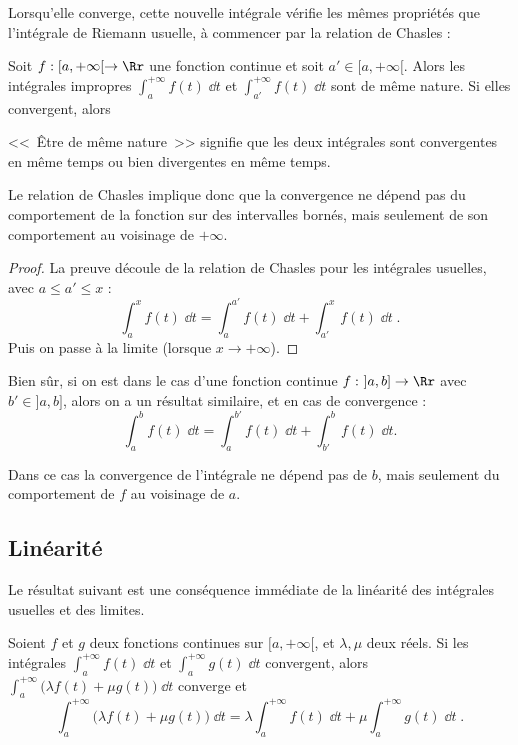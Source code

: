 \documentclass[class=report,crop=false]{standalone}
\begin{document}
Lorsqu'elle converge, cette nouvelle intégrale vérifie les mêmes 
propriétés que l'intégrale de Riemann usuelle, à commencer par la relation de Chasles :

\begin{proposition}
Soit $f : [a,+\infty[ \to \Rr$ une fonction continue et soit
  $a' \in [a,+\infty[$. 
  Alors les intégrales impropres $\int_a^{+\infty} f(t) \;\dd t$ 
  et $\int_{a'}^{+\infty} f(t) \;\dd t $ sont de même nature. 
  Si elles convergent, alors 
\end{proposition}

<<~\^Etre de même nature~>> signifie que les deux intégrales sont convergentes en même temps
ou bien divergentes en même temps.

Le relation de Chasles implique donc que la convergence ne dépend
pas du comportement de la fonction sur des intervalles bornés,
mais seulement de son comportement au voisinage de $+\infty$.

\begin{proof}
La preuve découle de la relation de Chasles pour les intégrales usuelles, avec $a \le a' \le x$ : 
$$\int_a^x f(t) \;\dd t = \int_a^{a'}f(t) \;\dd t+\int_{a'}^x f(t) \;\dd t\;.$$
Puis on passe à la limite (lorsque $x\to+\infty$).
\end{proof}

\bigskip

Bien sûr, si on est dans le cas d'une fonction continue $f : \ ]a,b] \to \Rr$ avec
$b' \in ]a,b]$, alors on a un résultat similaire, et en cas de convergence :
  $$\int_a^{b} f(t) \;\dd t = \int_{a}^{b'} f(t) \;\dd t+ \int_{b'}^{b} f(t) \;\dd t.$$

Dans ce cas la convergence de l'intégrale ne dépend pas de $b$, mais seulement 
du comportement de $f$ au voisinage de $a$.


\subsection{Linéarité}

Le résultat suivant est une conséquence immédiate de la
linéarité des intégrales usuelles et des limites.

\begin{proposition}
\label{prop:lineariteintegralescv}
Soient $f$ et $g$ deux fonctions continues sur
$[a,+\infty[$, et $\lambda,\mu$ deux réels. Si
les intégrales $\int_a^{+\infty} f(t)\;\dd t$ et 
$\int_a^{+\infty} g(t)\;\dd t$ convergent, alors 
$\int_a^{+\infty} \big(\lambda f(t)+\mu g(t)\big)\;\dd t$ converge et
$$\int_a^{+\infty} \big(\lambda f(t) + \mu g(t)\big)\;\dd t = \lambda \int_a^{+\infty}
f(t)\;\dd t +\mu \int_a^{+\infty} g(t)\;\dd t\;.$$
\end{proposition}
\end{document}
